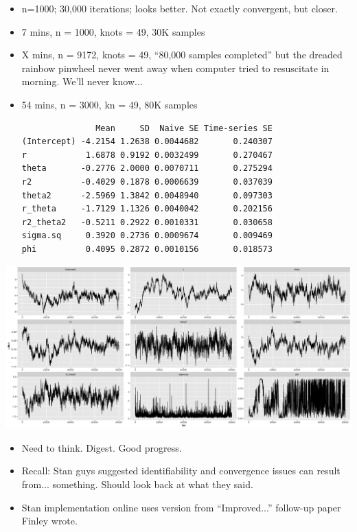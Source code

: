 \documentclass{article}
\begin{document}
\begin{itemize}
\begin{itemize}
      \item n=1000; 30,000 iterations; looks better. Not exactly convergent, but closer.
      \item 7 mins, n = 1000, knots = 49, 30K samples
      \item X mins, n = 9172, knots = 49, ``80,000 samples completed'' but the dreaded rainbow pinwheel never went away when computer tried to resuscitate in morning. We'll never know...
      \item 54 mins, n = 3000, kn = 49, 80K samples   
      \begin{verbatim}
               Mean     SD  Naive SE Time-series SE
(Intercept) -4.2154 1.2638 0.0044682       0.240307
r            1.6878 0.9192 0.0032499       0.270467
theta       -0.2776 2.0000 0.0070711       0.275294
r2          -0.4029 0.1878 0.0006639       0.037039
theta2      -2.5969 1.3842 0.0048940       0.097303
r_theta     -1.7129 1.1326 0.0040042       0.202156
r2_theta2   -0.5211 0.2922 0.0010331       0.030658
sigma.sq     0.3920 0.2736 0.0009674       0.009469
phi          0.4095 0.2872 0.0010156       0.018573
\end{verbatim}
      \end{itemize}
\end{itemize}
\includegraphics[scale=.1]{n3000.jpeg} 
\begin{itemize}
      

\item Need to think. Digest. Good progress.
\item Recall: Stan guys suggested identifiability and convergence issues can result from... something. Should look back at what they said. 
\item Stan implementation online uses version from ``Improved...'' follow-up paper Finley wrote.
\end{itemize}
\end{document}
